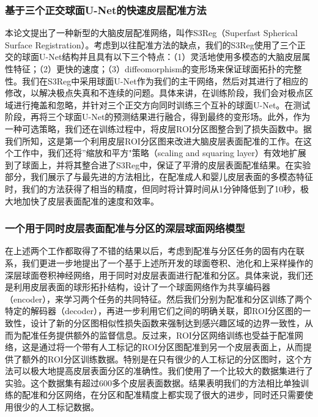 \subsubsection{基于三个正交球面U-Net的快速皮层配准方法}
本论文提出了一种新型的大脑皮层配准网络，叫作S3Reg（Superfast Spherical Surface Registration）。考虑到以往配准方法的缺点，我们的S3Reg使用了三个正交的球面U-Net结构并且具有以下三个特点：（1）灵活地使用多模态的大脑皮层属性特征；（2）更快的速度；（3）diffeomorphism的变形场来保证球面拓扑的完整性。我们在S3Reg中采用球面U-Net作为我们的主干网络，然后对其进行了相应的修改，以解决极点失真和不连续的问题。具体来讲，在训练阶段，我们会对极点区域进行掩盖和忽略，并针对三个正交方向同时训练三个互补的球面U-Net。在测试阶段，再将三个球面U-Net的预测结果进行融合，得到最终的变形场。此外，作为一种可选策略，我们还在训练过程中，将皮层ROI分区图整合到了损失函数中。据我们所知，这是第一个利用皮层ROI分区图来改进大脑皮层表面配准的工作。在这个工作中，我们还将”缩放和平方"策略（scaling and squaring layer）有效地扩展到了球面上，并将其整合进了S3Reg中，保证了平滑的皮层表面配准结果。在实验部分，我们展示了与最先进的方法相比，在配准成人和婴儿皮层表面的多模态特征时，我们的方法获得了相当的精度，但同时将计算时间从1分钟降低到了10秒，极大地加快了皮层表面配准的速度和效率。

\subsubsection{一个用于同时皮层表面配准与分区的深层球面网络模型}
在上述两个工作都取得了不错的结果以后，考虑到配准与分区任务的固有内在联系，我们更进一步地提出了一个基于上述所开发的球面卷积、池化和上采样操作的深层球面卷积神经网络，用于同时对皮层表面进行配准和分区。具体来说，我们还是利用皮层表面的球形拓扑结构，设计了一个球面网络作为共享编码器（encoder），来学习两个任务的共同特征。然后我们分别为配准和分区训练了两个特定的解码器（decoder），再进一步利用它们之间的明确关联，即ROI分区图的一致性，设计了新的分区图相似性损失函数来强制达到感兴趣区域的边界一致性，从而为配准任务提供额外的监督信息。反过来，ROI分区网络训练也受益于配准网络，这是通过将一个带有人工标记的ROI分区图配准到另一个皮层表面上，从而提供了额外的ROI分区训练数据。特别是在只有很少的人工标记的分区图时，这个方法可以极大地提高皮层表面分区的准确性。我们使用了一个比较大的数据集进行了实验。这个数据集有超过600多个皮层表面数据。结果表明我们的方法相比单独训练的配准和分区网络，在分区和配准精度上都实现了很大的进步，同时还只需要使用很少的人工标记数据。

